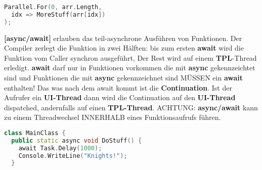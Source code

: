 \documentclass[8pt]{extarticle}
\let\oldtextbf\textbf
\renewcommand{\textbf}{\tiny\oldtextbf}
\begin{document}
\begin{multicols*}{5}
\begin{lstlisting}[language=c++]
Parallel.For(0, arr.Length,
  idx => MoreStuff(arr[idx])
);
\end{lstlisting}
\textbf{[async/await]} erlauben das teil-asynchrone Ausführen von Funktionen. Der Compiler zerlegt die Funktion in zwei Hälften: bis zum ersten \textbf{await} wird die Funktion vom Caller synchron ausgeführt, Der Rest wird auf einem \textbf{TPL}-Thread erledigt. \textbf{await} darf nur in Funktionen vorkommen die mit \textbf{async} gekennzeichtet sind und Funktionen die mit \textbf{async} gekennzeichnet sind MÜSSEN ein \textbf{await} enthalten! Das was nach dem await kommt ist die \textbf{Continuation}. Ist der Aufrufer ein \textbf{UI-Thread} dann wird die Continuation auf den \textbf{UI-Thread} dispatched, andernfalls auf einen \textbf{TPL-Thread}. ACHTUNG: \textbf{async/await} kann zu einem Threadwechsel INNERHALB eines Funktionsaufrufs führen.
\begin{lstlisting}[language=c++]
class MainClass {
  public static async void DoStuff() {
    await Task.Delay(1000);
    Console.WriteLine("Knights!");
  }


\end{lstlisting}
\end{multicols*}
\end{document}
